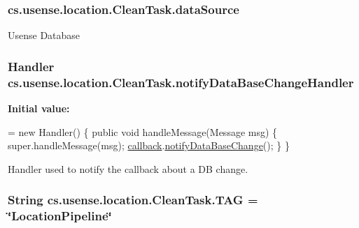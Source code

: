 \subsubsection[{data\+Source}]{ cs.\+usense.\+location.\+Clean\+Task.\+data\+Source\hspace{0.3cm}{\ttfamily [private]}}\label{classcs_1_1usense_1_1location_1_1_clean_task_a5ef1698db183a017fd359be211bcae32}
Usense Database \hypertarget{classcs_1_1usense_1_1location_1_1_clean_task_ab8a01d00f36803279927b7df497d5641}{}
\subsubsection[{notify\+Data\+Base\+Change\+Handler}]{\setlength{\rightskip}{0pt plus 5cm}Handler cs.\+usense.\+location.\+Clean\+Task.\+notify\+Data\+Base\+Change\+Handler\hspace{0.3cm}{\ttfamily [private]}}\label{classcs_1_1usense_1_1location_1_1_clean_task_ab8a01d00f36803279927b7df497d5641}
{\bfseries Initial value\+:}
\begin{DoxyCode}
= \textcolor{keyword}{new} Handler() \{
        \textcolor{keyword}{public} \textcolor{keywordtype}{void} handleMessage(Message msg) \{
            super.handleMessage(msg);
            \hyperlink{classcs_1_1usense_1_1location_1_1_clean_task_a8b902c430d2b3a4369934283e547bf79}{callback}.\hyperlink{classcs_1_1usense_1_1location_1_1_location_pipeline_a2dc0b2f65fc9c6d15a037eb3528e8c14}{notifyDataBaseChange}();
        \}
    \}
\end{DoxyCode}
Handler used to notify the callback about a D\+B change. \hypertarget{classcs_1_1usense_1_1location_1_1_clean_task_a4bdda62bc609f592de1371a578225c8f}{}
\subsubsection[{T\+A\+G}]{\setlength{\rightskip}{0pt plus 5cm}String cs.\+usense.\+location.\+Clean\+Task.\+T\+A\+G = \char`\"{}Location\+Pipeline\char`\"{}\hspace{0.3cm}{\ttfamily [private]}}\label{classcs_1_1usense_1_1location_1_1_clean_task_a4bdda62bc609f592de1371a578225c8f}
\hypertarget{classcs_1_1usense_1_1location_1_1_clean_task_a7ac42a9cae72c0162de562270d727dab}{}
